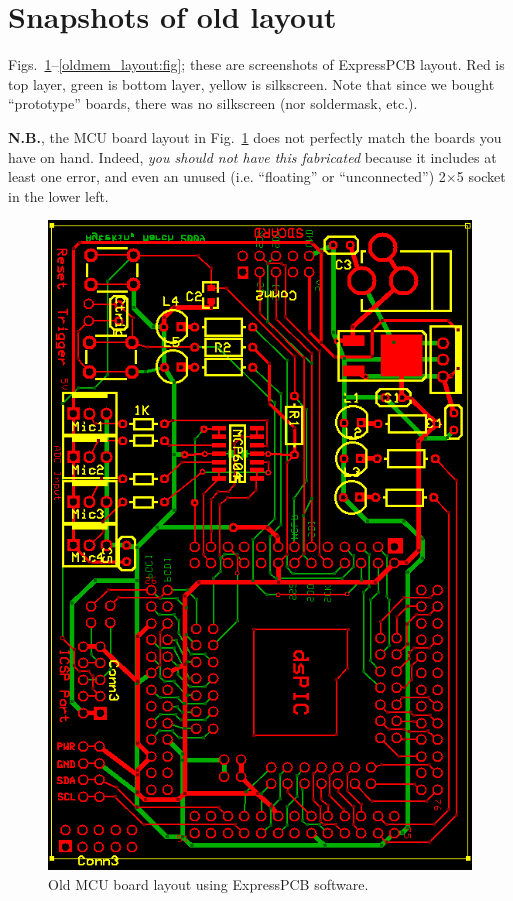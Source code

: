 \documentclass[letterpaper]{article}
\begin{document}
\appendix

\section{Snapshots of old layout}
\label{oldsnapshots:sec}

Figs.~\ref{oldmcu_layout:fig}--\ref{oldmem_layout:fig}; these are
screenshots of ExpressPCB layout. Red is top layer, green is bottom
layer, yellow is silkscreen. Note that since we bought ``prototype''
boards, there was no silkscreen (nor soldermask, etc.).

\textbf{N.B.}, the MCU board layout in Fig.~\ref{oldmcu_layout:fig}
does not perfectly match the boards you have on hand. Indeed,
\textit{you should not have this fabricated} because it includes at
least one error, and even an unused (i.e. ``floating'' or
``unconnected'') 2$\times$5 socket in the lower left.

\begin{figure}
\centering
\includegraphics[height=\textheight]{figures/old_mcu_layout.png}
\caption[Old microcontroller board layout using ExpressPCB]{Old MCU
  board layout using ExpressPCB software.}
\label{oldmcu_layout:fig}
\end{figure}
\end{document}
